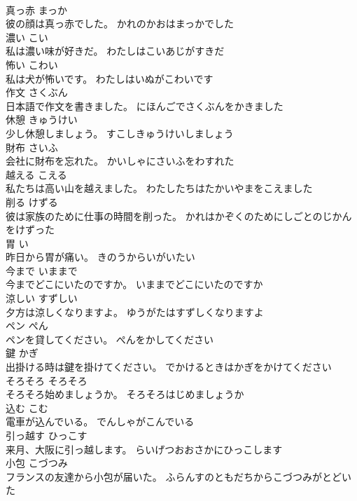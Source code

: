 \documentclass[8pt]{extreport}
\begin{document}
\begin{CJK}{UTF8}{min}
\\	真っ赤	まっか	
\\	彼の顔は真っ赤でした。	かれのかおはまっかでした	
\\	濃い	こい	
\\	私は濃い味が好きだ。	わたしはこいあじがすきだ	
\\	怖い	こわい	
\\	私は犬が怖いです。	わたしはいぬがこわいです	
\\	作文	さくぶん	
\\	日本語で作文を書きました。	にほんごでさくぶんをかきました	
\\	休憩	きゅうけい	
\\	少し休憩しましょう。	すこしきゅうけいしましょう	
\\	財布	さいふ	
\\	会社に財布を忘れた。	かいしゃにさいふをわすれた	
\\	越える	こえる	
\\	私たちは高い山を越えました。	わたしたちはたかいやまをこえました	
\\	削る	けずる	
\\	彼は家族のために仕事の時間を削った。	かれはかぞくのためにしごとのじかんをけずった	
\\	胃	い	
\\	昨日から胃が痛い。	きのうからいがいたい	
\\	今まで	いままで	
\\	今までどこにいたのですか。	いままでどこにいたのですか	
\\	涼しい	すずしい	
\\	夕方は涼しくなりますよ。	ゆうがたはすずしくなりますよ	
\\	ペン	ぺん	
\\	ペンを貸してください。	ぺんをかしてください	
\\	鍵	かぎ	
\\	出掛ける時は鍵を掛けてください。	でかけるときはかぎをかけてください	
\\	そろそろ	そろそろ	
\\	そろそろ始めましょうか。	そろそろはじめましょうか	
\\	込む	こむ	
\\	電車が込んでいる。	でんしゃがこんでいる	
\\	引っ越す	ひっこす	
\\	来月、大阪に引っ越します。	らいげつおおさかにひっこします	
\\	小包	こづつみ	
\\	フランスの友達から小包が届いた。	ふらんすのともだちからこづつみがとどいた	

\end{CJK}
\end{document}
